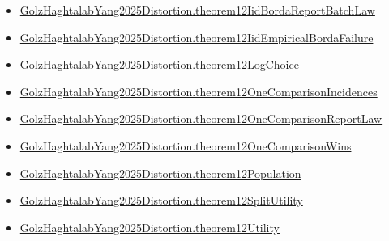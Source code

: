 \documentclass[10pt]{article}
\begin{document}
\begin{itemize}
\item \hyperlink{governing-declaration-e5cae00c98b32d81}{Golz\allowbreak{}Haghtalab\allowbreak{}Yang2025\allowbreak{}Distortion.\allowbreak{}theorem12\allowbreak{}Iid\allowbreak{}Borda\allowbreak{}Report\allowbreak{}Batch\allowbreak{}Law}
\item \hyperlink{governing-declaration-3940e2eb509393ea}{Golz\allowbreak{}Haghtalab\allowbreak{}Yang2025\allowbreak{}Distortion.\allowbreak{}theorem12\allowbreak{}Iid\allowbreak{}Empirical\allowbreak{}Borda\allowbreak{}Failure}
\item \hyperlink{governing-declaration-df5d365b55936500}{Golz\allowbreak{}Haghtalab\allowbreak{}Yang2025\allowbreak{}Distortion.\allowbreak{}theorem12\allowbreak{}Log\allowbreak{}Choice}
\item \hyperlink{governing-declaration-baa615edc2baf254}{Golz\allowbreak{}Haghtalab\allowbreak{}Yang2025\allowbreak{}Distortion.\allowbreak{}theorem12\allowbreak{}One\allowbreak{}Comparison\allowbreak{}Incidences}
\item \hyperlink{governing-declaration-9f5f3a71633fcfda}{Golz\allowbreak{}Haghtalab\allowbreak{}Yang2025\allowbreak{}Distortion.\allowbreak{}theorem12\allowbreak{}One\allowbreak{}Comparison\allowbreak{}Report\allowbreak{}Law}
\item \hyperlink{governing-declaration-0d61e98c23f20a22}{Golz\allowbreak{}Haghtalab\allowbreak{}Yang2025\allowbreak{}Distortion.\allowbreak{}theorem12\allowbreak{}One\allowbreak{}Comparison\allowbreak{}Wins}
\item \hyperlink{governing-declaration-787bb3a4dec78d2f}{Golz\allowbreak{}Haghtalab\allowbreak{}Yang2025\allowbreak{}Distortion.\allowbreak{}theorem12\allowbreak{}Population}
\item \hyperlink{governing-declaration-35d01f4df2faa71d}{Golz\allowbreak{}Haghtalab\allowbreak{}Yang2025\allowbreak{}Distortion.\allowbreak{}theorem12\allowbreak{}Split\allowbreak{}Utility}
\item \hyperlink{governing-declaration-a73ce8ecb43a8abd}{Golz\allowbreak{}Haghtalab\allowbreak{}Yang2025\allowbreak{}Distortion.\allowbreak{}theorem12\allowbreak{}Utility}
\end{itemize}
\end{document}
